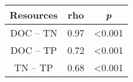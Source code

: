 
\begin{table}[ht]
\centering

\begin{tabular}{ccc}
\hline
\hline
Resources &	rho & \emph{p} \\
\hline
DOC -- TN & 0.97 & \textless 0.001 \\
DOC -- TP & 0.72 & \textless 0.001 \\
TN -- TP  & 0.68 & \textless 0.001 \\
\hline
\end{tabular}
\end{table}
